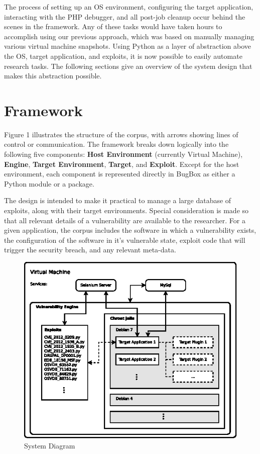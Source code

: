 \documentclass[letterpaper,twocolumn,10pt]{article}
\begin{document}
The process of setting up an OS environment, configuring the target application, interacting with the PHP debugger, and all post-job cleanup occur behind the scenes in the framework. Any of these tasks would have taken hours to accomplish using our previous approach, which was based on manually managing various virtual machine snapshots. Using Python as a layer of abstraction above the OS, target application, and exploits, it is now possible to easily automate research tasks. The following sections give an overview of the system design that makes this abstraction possible.

\section{Framework}

Figure 1 illustrates the structure of the corpus, with arrows showing lines of control or communication. The framework breaks down logically into the following five components: {\bf Host Environment} (currently Virtual Machine), {\bf Engine}, {\bf Target Environment}, {\bf Target}, and {\bf Exploit}. Except for the host environment, each component is represented directly in BugBox as either a Python module or a package.\par
The design is intended to make it practical to manage a large database of exploits, along with their target environments. Special consideration is made so that all relevant details of a vulnerability are available to the researcher. For a given application, the corpus includes the software in which a vulnerability exists, the configuration of the software in it's vulnerable state, exploit code that will trigger the security breach, and any relevant meta-data. 


\begin{figure}[!tp]
\begin{center}
\includegraphics[scale=1.17]{system_diagram.eps}
\end{center}
\caption{System Diagram}
\end{figure}
\end{document}
